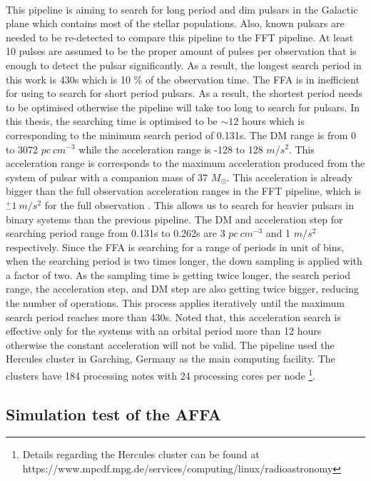 \documentclass[../chapter1/thesis_msc.tex]{subfiles}
\begin{document}
\paragraph{} This pipeline is aiming to search for long period and dim pulsars in the Galactic plane which contains most of the stellar populations. Also, known pulsars are needed to be re-detected to compare this pipeline to the FFT pipeline. At least 10 pulses are assumed to be the proper amount of pulses per observation that is enough to detect the pulsar significantly. As a result, the longest search period in this work is 430s which is 10 \% of the observation time. The FFA is in inefficient for using to search for short period pulsars. As a result, the shortest period needs to be optimised otherwise the pipeline will take too long to search for pulsars. In this thesis, the searching time is optimised to be $\sim 12$ hours which is corresponding to the minimum search period of 0.131s. The DM range is from 0 to 3072 $pc~cm^{-3}$ while the acceleration range is -128 to 128 $m/s^2$. This acceleration range is corresponds to the maximum acceleration produced from the system of pulsar with a companion mass of 37 $M_\odot$. This acceleration is already bigger than the full observation acceleration ranges in the FFT pipeline, which is $^+_-1 ~m/s^2$ for the full observation \citep{ng2015high}. This allows us to search for heavier pulsars in binary systems than the previous pipeline. The DM and acceleration step for searching period range from 0.131s to 0.262s are 3 $pc~cm^{-3}$ and 1 $m/s^2$ respectively. Since the FFA is searching for a range of periods in unit of bins, when the searching period is two times longer, the down sampling is applied with a factor of two. As the sampling time is getting twice longer, the search period range, the acceleration step, and DM step are also getting twice bigger, reducing the number of operations. This process applies iteratively until the maximum search period reaches more than 430s. Noted that, this acceleration search is effective only for the systems with an orbital period more than 12 hours otherwise the constant acceleration will not be valid. The pipeline used the Hercules cluster in Garching, Germany as the main computing facility. The clusters have 184 processing notes with 24 processing cores per node \footnote{ Details regarding the Hercules cluster can be found at https://www.mpcdf.mpg.de/services/computing/linux/radioastronomy}. 
\subsection{Simulation test of the AFFA}
\end{document}
